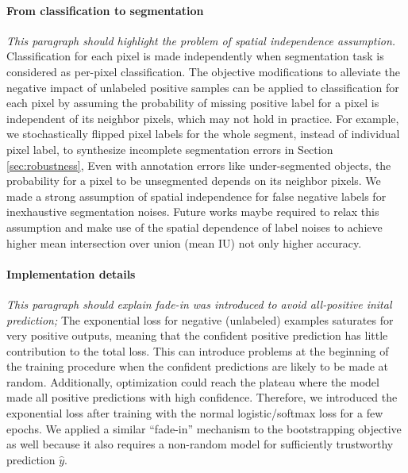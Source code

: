 \paragraph{From classification to segmentation}
\noindent \textit{This paragraph should highlight the problem of spatial independence assumption.}
Classification for each pixel is made independently when segmentation task is considered as per-pixel classification.
The objective modifications to alleviate the negative impact of unlabeled positive samples can be applied to classification for each pixel by assuming the probability of missing positive label for a pixel is independent of its neighbor pixels, which may not hold in practice.
For example, we stochastically flipped pixel labels for the whole segment, instead of individual pixel label, to synthesize incomplete segmentation errors in Section \ref{sec:robustness},
Even with annotation errors like under-segmented objects, the probability for a pixel to be unsegmented depends on its neighbor pixels.
We made a strong assumption of spatial independence for false negative labels for inexhaustive segmentation noises.
Future works maybe required to relax this assumption and make use of the spatial dependence of label noises to achieve higher mean intersection over union (mean IU) not only higher accuracy.


\paragraph{Implementation details}
\noindent \textit{This paragraph should explain fade-in was introduced to avoid all-positive inital prediction;}
\noindent
The exponential loss for negative (unlabeled) examples saturates for very positive outputs, meaning that the confident positive prediction has little contribution to the total loss.
This can introduce problems at the beginning of the training procedure when the confident predictions are likely to be made at random.
Additionally, optimization could reach the plateau where the model made all positive predictions with high confidence.
Therefore, we introduced the exponential loss after training with the normal logistic/softmax loss for a few epochs.
We applied a similar ``fade-in'' mechanism to the bootstrapping objective as well because it also requires a non-random model for sufficiently trustworthy prediction $\hat{y}$.


